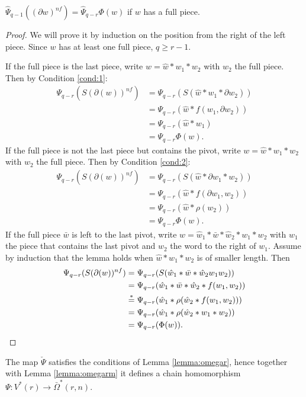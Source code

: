 	\begin{lemma} $\hat{\Psi}_{q-1}((\partial w)^{nf}) = \hat{\Psi}_{q-r}\Phi(w)$ if $w$ has a full piece.
	\end{lemma}
	\begin{proof} We will prove it by induction on the position from the right of the left piece. Since $w$ has at least one full piece, $q\geq r-1$.

		If the full piece is the last piece, write $w=\hat{w}*w_1*w_2$ with $w_2$ the full piece. Then by Condition \eqref{cond:1}:
		\begin{align*}
			\Psi_{q-r}(S(\partial(w))^{nf}) &= \Psi_{q-r}(S(\hat{w}*w_1*\partial w_2)) \\
			&= \Psi_{q-r}(\hat{w}*f(w_1,\partial w_2)) \\
			&= \Psi_{q-r}(\hat{w}*w_1) \\
			&= \Psi_{q-r}\Phi(w).
		\end{align*}
		If the full piece is not the last piece but contains the pivot, write $w=\hat{w}*w_1*w_2$ with $w_2$ the full piece. Then by Condition \eqref{cond:2}:
		\begin{align*}
			\Psi_{q-r}(S(\partial(w))^{nf}) &= \Psi_{q-r}(S(\hat{w}*\partial w_1* w_2)) \\
			&= \Psi_{q-r}(\hat{w}*f(\partial w_1, w_2)) \\
			&= \Psi_{q-r}(\hat{w}*\rho(w_2)) \\
			&= \Psi_{q-r}\Phi(w).
		\end{align*}
		If the full piece $\bar{w}$ is left to the last pivot, write $w=\hat{w}_1*\bar{w}*\hat{w}_2*w_1*w_2$ with $w_1$ the piece that contains the last pivot and $w_2$ the word to the right of $w_1$. Assume by induction that the lemma holds when $\hat{w}*w_1*w_2$ is of smaller length. Then
		\begin{align*}
			\Psi_{q-r}(S(\partial(w))^{nf}) &= \Psi_{q-r}(S(\hat{w}_1*\bar{w}*\hat{w}_2w_1w_2)) \\
			&= \Psi_{q-r}(\hat{w}_1*\bar{w}*\hat{w}_2*f(w_1,w_2)) \\
			&\overset{*}{=} \Psi_{q-r}(\hat{w}_1*\rho(\hat{w}_2*f(w_1,w_2)))\\
			&= \Psi_{q-r}(\hat{w}_1*\rho(\hat{w}_2*w_1*w_2))\\
			&=  \Psi_{q-r}(\Phi(w)). \qedhere
		\end{align*}
	\end{proof}
	\begin{corollary} The map $\check{\Psi}$ satisfies the conditions of Lemma \ref{lemma:omegar}, hence together with Lemma \ref{lemma:omegarm} it defines a chain homomorphism $\Psi\colon V^*(r)\to \bar{\Omega}^*(r,n)$.
	\end{corollary}






